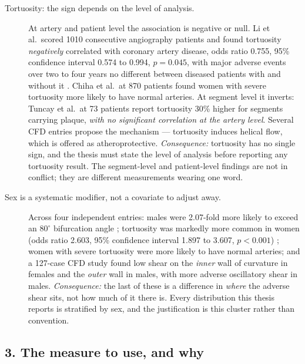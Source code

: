 \begin{description}
\item[Tortuosity: the sign depends on the level of analysis.]
At artery and patient level the association is negative or null. Li et al.\ scored 1010 consecutive
angiography patients and found tortuosity \emph{negatively} correlated with coronary artery disease,
odds ratio 0.755, 95\% confidence interval 0.574 to 0.994, $p = 0.045$, with major adverse events
over two to four years no different between diseased patients with and without it
\cite{li2011tortuosity}. Chiha et al.\ at 870 patients found women with severe tortuosity more
likely to have normal arteries. At segment level it inverts: Tuncay et al.\ at 73 patients report
tortuosity 30\% higher for segments carrying plaque, \emph{with no significant correlation at the
artery level}. Several CFD entries propose the mechanism --- tortuosity induces helical flow, which
is offered as atheroprotective.
\textit{Consequence:} tortuosity has no single sign, and the thesis must state the level of analysis
before reporting any tortuosity result. The segment-level and patient-level findings are not in
conflict; they are different measurements wearing one word.

\item[Sex is a systematic modifier, not a covariate to adjust away.]
Across four independent entries: males were 2.07-fold more likely to exceed an $80^\circ$
bifurcation angle \cite{temov2016bifurcation}; tortuosity was markedly more common in women
(odds ratio 2.603, 95\% confidence interval 1.897 to 3.607, $p < 0.001$) \cite{li2011tortuosity};
women with severe tortuosity were more likely to have normal arteries; and a 127-case CFD study
found low shear on the \emph{inner} wall of curvature in females and the \emph{outer} wall in males,
with more adverse oscillatory shear in males.
\textit{Consequence:} the last of these is a difference in \emph{where} the adverse shear sits, not
how much of it there is. Every distribution this thesis reports is stratified by sex, and the
justification is this cluster rather than convention.

\end{description}

\subsection*{3. The measure to use, and why}

